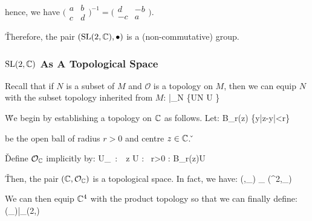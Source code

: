 hence, we have $\biggl(\begin{matrix} a & b \\ c & d \end{matrix}\biggr)^{-1}= \biggl(\begin{matrix} d & -b \\ -c & a
\end{matrix}\biggr)$.
\een

\v

Therefore, the pair $(\operatorname{SL}(2,\mathbb{C}),\bullet)$ is a (non-commutative) group.

\subsubsection*{$\operatorname{SL}(2,\mathbb{C})$ As A Topological Space}

Recall that if $N$ is a subset of $M$ and $\mathcal{O}$ is a topology on $M$, then we can equip $N$ with the subset
topology inherited from $M$:
\bse
{}|_N \coloneqq \{U\cap N \mid U \in {}\}
\ese

\v

We begin by establishing a topology on $\mathbb{C}$ as follows. Let:
\bse
B_r(z) \coloneqq \{y\in\C\mid |z-y|<r\}
\ese

be the open ball of radius $r>0$ and centre $z\in \mathbb{C}$. \v

\begin{center}
\end{center}

\v

Define $\mathcal{O}_{\mathbb{C}}$ implicitly by:
\bse
U\in {}_\C\ :\Leftrightarrow\ \forall \, z \in U : \exists \, r>0 : B_r(z)\se U
\ese

\v

Then, the pair $(\mathbb{C},\mathcal{O}_{\mathbb{C}})$ is a topological space. In fact, we have:
\bse
(\C,_\C) \cong_ (\R^2,_)
\ese

We can then equip $\mathbb{C}^4$ with the product topology so that we can finally define:
\bse
{} \coloneqq (_\C)|_{\SL(2,\C)}
\ese

